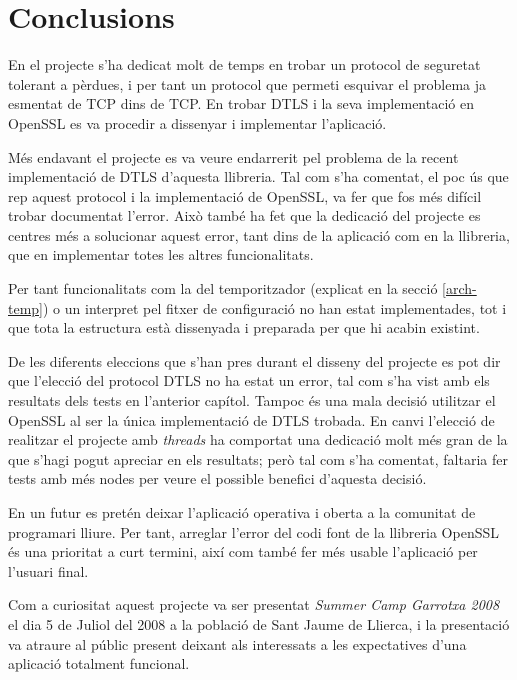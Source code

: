 \chapter{Conclusions}
En el projecte s'ha dedicat molt de temps en trobar un protocol de seguretat tolerant a pèrdues, i per tant un protocol que permeti esquivar el problema ja esmentat de TCP dins de TCP. En trobar DTLS i la seva implementació en OpenSSL es va procedir a dissenyar i implementar l'aplicació.

Més endavant el projecte es va veure endarrerit pel problema de la recent implementació de DTLS d'aquesta llibreria.
Tal com s'ha comentat, el poc ús que rep aquest protocol i la implementació de OpenSSL, va fer que fos més difícil trobar documentat l'error. Això també ha fet que la dedicació del projecte es centres més a solucionar aquest error, tant dins de la aplicació com en la llibreria, que en implementar totes les altres funcionalitats.

Per tant funcionalitats com la del temporitzador (explicat en la secció \ref{arch-temp}) o un interpret pel fitxer de configuració no han estat implementades, tot i que tota la estructura està dissenyada i preparada per que hi acabin existint.

De les diferents eleccions que s'han pres durant el disseny del projecte es pot dir que l'elecció del protocol DTLS no ha estat un error, tal com s'ha vist amb els resultats dels tests en l'anterior capítol. Tampoc és una mala decisió utilitzar el OpenSSL al ser la única implementació de DTLS trobada. En canvi l'elecció de realitzar el projecte amb \emph{threads} ha comportat una dedicació molt més gran de la que s'hagi pogut apreciar en els resultats; però tal com s'ha comentat, faltaria fer tests amb més nodes per veure el possible benefici d'aquesta decisió.

En un futur es pretén deixar l'aplicació operativa i oberta a la comunitat de programari lliure.
Per tant, arreglar l'error del codi font de la llibreria OpenSSL és una prioritat a curt termini, així com també fer més usable l'aplicació per l'usuari final.

Com a curiositat aquest projecte va ser presentat \emph{Summer Camp Garrotxa 2008} el dia 5 de Juliol del 2008 a la població de Sant Jaume de Llierca, i la presentació va atraure al públic present deixant als interessats a les expectatives d'una aplicació totalment funcional.
